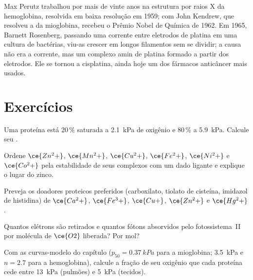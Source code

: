 \begin{history}
Max Perutz trabalhou por mais de vinte anos na estrutura por raios X da
hemoglobina, resolvida em baixa resolução em 1959; com John Kendrew, que resolveu
a da mioglobina, recebeu o Prêmio Nobel de Química de 1962. Em 1965, Barnett
Rosenberg, passando uma corrente entre eletrodos de platina em uma cultura de
bactérias, viu-as crescer em longos filamentos sem se dividir; a causa não era
a corrente, mas um complexo amin de platina formado a partir dos eletrodos. Ele
se tornou a cisplatina, ainda hoje um dos fármacos anticâncer mais usados.
\end{history}

\section{Exercícios}

\begin{exercise}[$\star$]\label{exo:b3:bioinorganic:1}
Uma proteína está 20\,\% saturada a \qty{2.1}{kPa} de oxigênio e 80\,\% a \qty{5.9}{kPa}. Calcule seu
.
\end{exercise}

\begin{exercise}[$\star$]\label{exo:b3:bioinorganic:2}
Ordene $\ce{Zn^2+}$, $\ce{Mn^2+}$, $\ce{Cu^2+}$, $\ce{Fe^2+}$, $\ce{Ni^2+}$ e $\ce{Co^2+}$ pela estabilidade de seus complexos com
um dado ligante e explique o lugar do zinco.
\end{exercise}

\begin{exercise}[$\star$]\label{exo:b3:bioinorganic:3}
Preveja os doadores proteicos preferidos (carboxilato, tiolato de cisteína,
imidazol de histidina) de $\ce{Ca^2+}$, $\ce{Fe^3+}$, $\ce{Cu+}$, $\ce{Zn^2+}$ e $\ce{Hg^2+}$.
\end{exercise}

\begin{exercise}[$\star$]\label{exo:b3:bioinorganic:4}
Quantos elétrons são retirados e quantos fótons absorvidos pelo fotossistema~II
por molécula de $\ce{O2}$ liberada? Por mol?
\end{exercise}

\begin{exercise}[$\star\star$]\label{exo:b3:bioinorganic:5}
Com as curvas-modelo do capítulo ($p_{50} = \qty{0.37}{kPa}$ para a mioglobina; \qty{3.5}{kPa} e $n = 2.7$ para a
hemoglobina), calcule a fração de seu oxigênio que cada proteína cede entre
\qty{13}{kPa} (pulmões) e \qty{5}{kPa} (tecidos).
\end{exercise}

